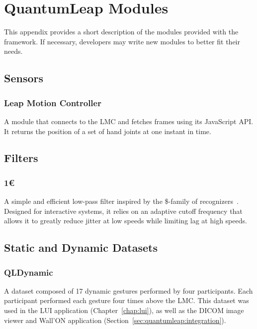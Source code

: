 \chapter{QuantumLeap Modules} \label{app:quantumleap-modules}
This appendix provides a short description of the modules provided with the \ql framework. If necessary, developers may write new modules to better fit their needs.

\section{Sensors} \label{app:quantumleap-modules:sensors}
\subsection{Leap Motion Controller}
A module that connects to the LMC and fetches frames using its JavaScript API. It returns the position of a set of hand joints at one instant in time.

\section{Filters} \label{app:quantumleap-modules:filters}
\subsection{1\euro}
A simple and efficient low-pass filter inspired by the \$-family of recognizers~\cite{Casiez:2012}. Designed for interactive systems, it relies on an adaptive cutoff frequency that allows it to greatly reduce jitter at low speeds while limiting lag at high speeds.

\section{Static and Dynamic Datasets} \label{app:quantumleap-modules:datasets}
\subsection{QLDynamic} 
A dataset composed of 17 dynamic gestures performed by four participants. Each participant performed each gesture four times above the LMC. This dataset was used in the LUI application (Chapter~\ref{chap:lui}), as well as the DICOM image viewer and Wall'ON application (Section~\ref{sec:quantumleap:integration}).
